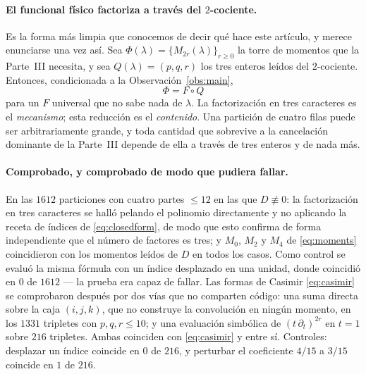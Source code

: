 \documentclass[11pt,a4paper]{article}
\begin{document}
\paragraph{El funcional f\'isico factoriza a trav\'es del $2$-cociente.} Es la forma m\'as
limpia que conocemos de decir qu\'e hace este art\'iculo, y merece enunciarse una vez as\'i. Sea
$\Phi(\lambda)=\{M_{2r}(\lambda)\}_{r\ge0}$ la torre de momentos que la Parte~III necesita, y
sea $Q(\lambda)=(p,q,r)$ los tres enteros le\'idos del $2$-cociente. Entonces, condicionada a la
Observaci\'on~\ref{obs:main},
\begin{equation}\label{eq:factorfunctional}
\boxed{\;\Phi=F\circ Q\;}
\end{equation}
para un $F$ universal que no sabe nada de $\lambda$. La factorizaci\'on en tres caracteres es el
\emph{mecanismo}; esta reducci\'on es el \emph{contenido}. Una partici\'on de cuatro filas puede
ser arbitrariamente grande, y toda cantidad que sobrevive a la cancelaci\'on dominante de la
Parte~III depende de ella a trav\'es de tres enteros y de nada m\'as.

\paragraph{Comprobado, y comprobado de modo que pudiera fallar.} En las $1612$ particiones con
cuatro partes $\le12$ en las que $D\not\equiv0$: la factorizaci\'on en tres caracteres se
hall\'o pelando el polinomio directamente y no aplicando la receta de \'indices de
\eqref{eq:closedform}, de modo que esto confirma de forma independiente que el n\'umero de
factores es tres; y $M_0$, $M_2$ y $M_4$ de \eqref{eq:moments} coincidieron con los momentos
le\'idos de $D$ en todos los casos. Como control se evalu\'o la misma f\'ormula con un
\'indice desplazado en una unidad, donde coincidi\'o en $0$ de $1612$ --- la prueba era capaz
de fallar. Las formas de Casimir \eqref{eq:casimir} se comprobaron despu\'es por dos v\'ias que
no comparten c\'odigo: una suma directa sobre la caja $(i,j,k)$, que no construye la
convoluci\'on en ning\'un momento, en los $1331$ tripletes con $p,q,r\le10$; y una evaluaci\'on
simb\'olica de $(t\,\partial_t)^{2r}$ en $t=1$ sobre $216$ tripletes. Ambas coinciden con
\eqref{eq:casimir} y entre s\'i. Controles: desplazar un \'indice coincide en $0$ de $216$, y
perturbar el coeficiente $4/15$ a $3/15$ coincide en $1$ de $216$.
\end{document}
